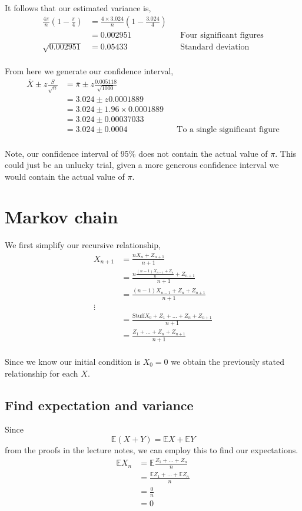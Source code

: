\documentclass{article}
\newcommand{\expect}{\mathbb{E}}
\begin{document}
It follows that our estimated variance is,
\begin{align*}
    \frac{4\pi}{n}\left(1-\frac{\pi}{4}\right)
    &= \frac{4\times3.024}{n}\left(1-\frac{3.024}{4}\right) \\
    &= 0.002951 && \text{Four significant figures} \\
    \sqrt{0.002951} &= 0.05433 && \text{Standard deviation} \\
\end{align*}

From here we generate our confidence interval,
\begin{align*}
    \bar{X} \pm z \frac{S}{\sqrt{n}} &= \bar{\pi} \pm z \frac{0.005118}{\sqrt{1000}} \\
    &= 3.024 \pm z 0.0001889 \\
    &= 3.024 \pm 1.96 \times 0.0001889 \\
    &= 3.024 \pm 0.00037033 \\
    &= 3.024 \pm 0.0004 && \text{To a single significant figure} \\
\end{align*}

Note, our confidence interval of 95\% does not contain the actual value
of $\pi$. This could just be an unlucky trial, given a more generous
confidence interval we would contain the actual value of $\pi$.

\section{Markov chain}
We first simplify our recursive relationship,
\begin{align*}
    X_{n+1} &= \frac{nX_n + Z_{n+1}}{n+1} \\
    &= \frac{n\frac{(n-1)X_{n-1} + Z_{n}}{n} + Z_{n+1}}{n+1} \\
    &= \frac{(n-1)X_{n-1} + Z_{n} + Z_{n+1}}{n+1} \\
    \vdots \\
    &= \frac{\text{Stuff}X_{0} + Z_1 + \dots + Z_{n} + Z_{n+1}}{n+1} \\
    &= \frac{Z_1 + \dots + Z_{n} + Z_{n+1}}{n+1} \\
\end{align*}

Since we know our initial condition is $X_0 = 0$ we obtain the previously
stated relationship for each $X$.

\subsection{Find expectation and variance}
Since
\[
    \expect(X + Y) = \expect X + \expect Y
\]
from the proofs in the lecture notes,
we can employ this to find our expectations.
\begin{align*}
    \expect X_n &= \expect \frac{Z_1 + \dots + Z_{n}}{n} \\
    &= \frac{\expect Z_1 + \dots + \expect Z_{n}}{n} \\
    &= \frac{0}{n} \\
    &= 0 \\
\end{align*}
\end{document}
